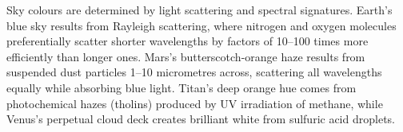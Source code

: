 Sky colours are determined by light scattering and spectral signatures. Earth's blue sky results from Rayleigh scattering, where nitrogen and oxygen molecules preferentially scatter shorter wavelengths by factors of 10–100 times more efficiently than longer ones. Mars's butterscotch-orange haze results from suspended dust particles 1–10 micrometres across, scattering all wavelengths equally while absorbing blue light. Titan's deep orange hue comes from photochemical hazes (tholins) produced by UV irradiation of methane, while Venus's perpetual cloud deck creates brilliant white from sulfuric acid droplets.